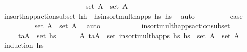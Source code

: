 \begin{isabellebody}
\ \ \ \ \ \ \ \ \ \ \ \ \ \ \ \ \ \ \ \ \ \ \ \ {\isachardoublequoteopen}set\ A{\isacharprime}{\kern0pt}\ {\isasymsubseteq}\ set\ A{\isacharprime}{\kern0pt}{\isacharprime}{\kern0pt}{\isachardoublequoteclose}\isanewline
\ \ \ \ \ \ \ \ \isamarkupfalse%
\ insort{\isacharunderscore}{\kern0pt}happ{\isacharunderscore}{\kern0pt}action{\isacharunderscore}{\kern0pt}subset{\isacharbrackleft}{\kern0pt}\ h{\isacharequal}{\kern0pt}{\isachardoublequoteopen}h{\isachardoublequoteclose}\ \ hs{\isacharequal}{\kern0pt}{\isachardoublequoteopen}insort{\isacharunderscore}{\kern0pt}mult{\isacharunderscore}{\kern0pt}happs\ hs\ hs\ \isamarkupfalse%
\ auto\isanewline
\ \ \ \ \ \ \isamarkupfalse%
\ \isamarkupfalse%
\ {\isacharquery}{\kern0pt}case\isanewline
\ \ \ \ \ \ \ \ \isamarkupfalse%
\ {\isacartoucheopen}set\ A\ {\isasymsubseteq}\ set\ A{\isacharprime}{\kern0pt}{\isacartoucheclose}\ \isamarkupfalse%
\ auto\isanewline
\ \ \ \ \isamarkupfalse%
\isanewline
\ \ \isamarkupfalse%
%
\endisatagproof
{\isafoldproof}%
%
\isadelimproof
\isanewline
%
\endisadelimproof
\isanewline
\ \ \isamarkupfalse%
\ insort{\isacharunderscore}{\kern0pt}mult{\isacharunderscore}{\kern0pt}happs{\isacharunderscore}{\kern0pt}action{\isacharunderscore}{\kern0pt}subset{}{\isacharcolon}{\kern0pt}\ \isanewline
\ \ \ \ \ {\isachardoublequoteopen}{\isacharparenleft}{\kern0pt}t\isactrlsub a{\isacharcomma}{\kern0pt}A{\isacharparenright}{\kern0pt}\ {\isasymin}\ set\ hs\ \isanewline
\ \ \ \ \ {\isachardoublequoteopen}{\isasymexists}A{\isacharprime}{\kern0pt}{\isachardot}{\kern0pt}\ {\isacharparenleft}{\kern0pt}t\isactrlsub a{\isacharcomma}{\kern0pt}A{\isacharprime}{\kern0pt}{\isacharparenright}{\kern0pt}\ {\isasymin}\ set\ {\isacharparenleft}{\kern0pt}insort{\isacharunderscore}{\kern0pt}mult{\isacharunderscore}{\kern0pt}happs\ hs\ hs\ {\isasymand}\ set\ A\ {\isasymsubseteq}\ set\ A{\isacharprime}{\kern0pt}{\isachardoublequoteclose}\isanewline
%
\isadelimproof
\ \ %
\endisadelimproof
%
\isatagproof
{}\isamarkupfalse%
\ {\isacharparenleft}{\kern0pt}induction\ hs\isanewline

\end{isabellebody}
